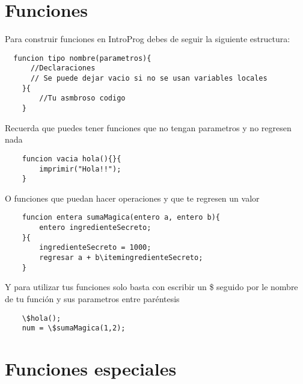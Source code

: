 \documentclass[
10pt, %
a4paper, %
oneside, %
headinclude,footinclude, %
BCOR5mm, %
]{scrartcl}
\begin{document}
\section{Funciones}

 Para construir funciones en IntroProg debes de seguir la siguiente estructura:

\begin{lstlisting}
  funcion tipo nombre(parametros){
      //Declaraciones
      // Se puede dejar vacio si no se usan variables locales
    }{
        //Tu asmbroso codigo
    }
\end{lstlisting}

Recuerda que puedes tener funciones que no tengan parametros y no regresen nada

\begin{lstlisting}
    funcion vacia hola(){}{
        imprimir("Hola!!");
    }
\end{lstlisting}

O funciones que puedan hacer operaciones y que te regresen un valor
\begin{lstlisting}
    funcion entera sumaMagica(entero a, entero b){
        entero ingredienteSecreto;
    }{
        ingredienteSecreto = 1000;
        regresar a + b\itemingredienteSecreto;
    }
\end{lstlisting}
Y para utilizar tus funciones solo basta con escribir un \$ seguido por le nombre de tu función y sus parametros entre paréntesis

\begin{lstlisting}
    \$hola();
    num = \$sumaMagica(1,2);
\end{lstlisting}

\section{Funciones especiales}
\end{document}
